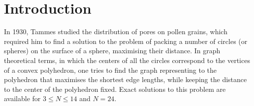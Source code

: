 \section{Introduction}
\label{sec:introductiongregorynewton}

In 1930, Tammes studied the distribution of pores on pollen grains, which
required him to find a solution to the problem of packing a number of circles
(or spheres) on the surface of a sphere, maximising their
distance.\autocite{Tammes_originnumberarrangement_1930} In graph theoretical
terms, in which the centers of all the circles correspond to the vertices of a
convex polyhedron, one tries to find the graph representing to the polyhedron
that maximises the shortest edge lengths, while keeping the distance to the
center of the polyhedron fixed. Exact solutions to this problem are available
for $3 \leq N \leq 14$ and
$N=24$.\autocite{Robinson_Arrangement24points_1961,Musin_TammesProblem14_2015}

